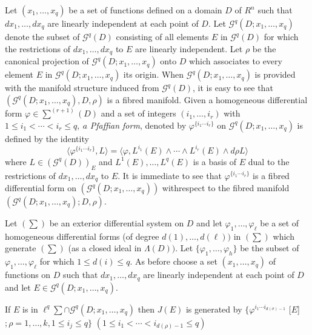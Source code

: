 Let $(x_1 ,  \ldots ,  x_q)$ be a set of functions defined on a domain
$D$ of $R^n$ such that $dx_1,  \ldots ,  dx_q$ are linearly
independent at each point of $D$. Let $\mathscr{G}^q (D; x_1 ,  \ldots
,  x_q)$ denote the subset of $\mathscr{G}^q (D)$ consisting of all
elements $E$ in $\mathscr{G}^q (D)$ for which the restrictions of
$dx_1 ,  \ldots ,  dx_q$ to $E$ are linearly independent. Let $\rho$
be the canonical projection of $\mathscr{G}^q (D; x_1,  \ldots ,
x_q)$ onto $D$ which associates  to every element $E$ in
$\mathscr{G}^q (D; x_1,  \ldots ,  x_q)$ its origin. When
$\mathscr{G}^q (D; x_1,  \ldots ,  x_q)$ is provided with the manifold
structure induced  from $\mathscr{G}^q (D)$,  it is easy to see that
$(\mathscr{G}^q (D; x_1,  \ldots ,  x_q),  D,  \rho)$ is a fibred
manifold. Given a homogeneous differential form $\varphi \in \sum^{(r
  +1)}(D)$ and a set of integers $(i_1 ,  \ldots ,  i_r)$ with $1 \le
i_1 < \cdots < i_r \le q,  ~ a $ \textit{Pfaffian form},  denoted by
$\varphi^{\{i_1 \cdots i_r\}}$ on $\mathscr{G}^q (D; x_1,  \ldots ,
x_q)$ is defined by the identity 
$$
\langle \varphi^{\{i_1 \cdots i_r\}},  L \rangle = \langle \varphi ,
L^{i_1} (E) \wedge \cdots \wedge L^{i_r } (E) \wedge d \rho L \rangle 
$$
where $L \in (\mathscr{G}^q (D))_E$ and $L^1 (E),  \ldots ,  L^q (E)$
is a basis of $E$ dual to the restrictions of $dx_1 ,  \ldots ,  dx_q$
to $E$. It is immediate to see that $\varphi^{\{i_1 \cdots i_r\}}$ is
a fibred differential form on $(\mathscr{G}^q (D; x_1,  \ldots ,
x_q))$ with\pageoriginale respect to the fibred manifold $(\mathscr{G}^q (D; x_1,
\ldots ,  x_q) ; D,  \rho)$. 

Let $(\sum)$ be an exterior differential system on $D$ and let
$\varphi_1 ,  \ldots ,  \varphi_\ell$ be a set of homogeneous
differential forms (of degree $d(1),  \ldots ,  d(\ell))$ in $(\sum)$
which generate $(\sum)$ (as a closed ideal in $\Lambda (D))$. Let
$\big \{\varphi_1 ,  \ldots,  \varphi_h \big \}$ be the subset of
$\varphi_1 ,  \ldots,  \varphi_\ell$ for which $1 \le d(i) \le q$. As
before choose a set $(x_1 ,  \ldots ,  x_q)$ of functions on $D$ such
that $dx_1 ,  \ldots ,  dx_q$ are linearly independent at each point
of $D$ and let $E \in \mathscr{G}^q (D; x_1,  \ldots ,  x_q)$. 

\begin{proposition}\label{chap2:sec2.3:prop5} %
  If $E$ is in $\ell^q \sum \cap \mathscr{G}^q (D; x_1, \ldots, x_q)$
  then $J(E)$ is generated by $\big \{\varphi^{i_1 \cdots i_{d
    (\sigma) - 1}} $ [$E$] $; \rho = 1,  \ldots,  k,  1 \le i_j \le q
  \big \}$ $(1 \le i_1 < \cdots < i_{d(\rho) - 1} \le q)$ 
\end{proposition}

